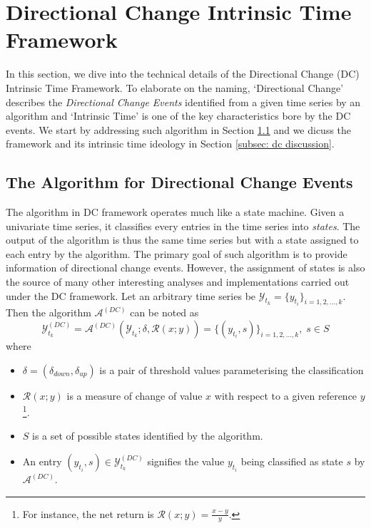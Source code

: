 \section{Directional Change Intrinsic Time Framework}

In this section, we dive into the technical details of the Directional Change (DC) Intrinsic Time Framework. To elaborate on the naming, `Directional Change' describes the \textit{Directional Change Events} identified from a given time series by an algorithm and `Intrinsic Time' is one of the key characteristics bore by the DC events. We start by addressing such algorithm in Section \ref{subsec: dc algo} and we dicuss the framework and its intrinsic time ideology in Section \ref{subsec: dc discussion}.

\subsection{The Algorithm for Directional Change Events}\label{subsec: dc algo}
The algorithm in DC framework operates much like a state machine. Given a univariate time series, it classifies every entries in the time series into \textit{states}. The output of the algorithm is thus the same time series but with a state assigned to each entry by the algorithm. The primary goal of such algorithm is to provide information of directional change events. However, the assignment of states is also the source of many other interesting analyses and implementations carried out under the DC framework. Let an arbitrary time series be $\mathcal{Y}_{t_k} = \{y_{t_i} \}_{i = 1, 2, \ldots, k}$. Then the algorithm $\mathcal{A}^{(DC)}$ can be noted as
\begin{equation*}
    \mathcal{Y}_{t_k}^{(DC)} = \mathcal{A}^{(DC)} (\mathcal{Y}_{t_k} ; \delta, \mathcal{R} (x; y)) = \{ (y_{t_i}, s)\}_{i = 1, 2, \ldots, k}, \; s \in S
\end{equation*}
where
\begin{itemize}
    \setlength\itemsep{-5pt}
    \item $\delta = (\delta_{down}, \delta_{up})$ is a pair of threshold values parameterising the classification
    \item $\mathcal{R} (x; y)$ is a measure of change of value $x$ with respect to a given reference $y$\footnote{For instance, the net return is $\mathcal{R} (x; y) = \frac{x - y}{y}$.}.
    \item $S$ is a set of possible states identified by the algorithm. 
    \item An entry $(y_{t_i}, s) \in \mathcal{Y}_{t_k}^{(DC)}$ signifies the value $y_{t_i}$ being classified as state $s$ by $\mathcal{A}^{(DC)}$.
\end{itemize}
